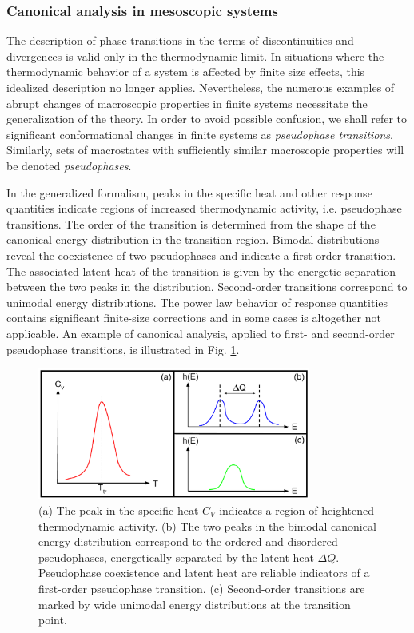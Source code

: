 \documentclass[12pt]{report}
\begin{document}
\subsubsection{Canonical analysis in mesoscopic systems} 
The description of phase transitions in the terms of discontinuities and divergences is valid only in the thermodynamic limit. In situations where the thermodynamic behavior of a system is affected by finite size effects, this idealized description no longer applies. Nevertheless, the numerous examples of abrupt changes of macroscopic properties in finite systems necessitate the generalization of the theory. In order to avoid possible confusion, we shall refer to significant conformational changes in finite systems as \textit{pseudophase transitions}. Similarly, sets of macrostates with sufficiently similar macroscopic properties will be denoted \textit{pseudophases}.

In the generalized formalism, peaks in the specific heat and other response quantities indicate regions of increased thermodynamic activity, i.e. pseudophase transitions. The order of the transition is determined from the shape of the canonical energy distribution in the transition region. Bimodal distributions reveal the coexistence of two pseudophases and indicate a first-order transition\cite{Janke1998}. The associated latent heat of the transition is given by the energetic separation between the two peaks in the distribution. Second-order transitions correspond to unimodal energy distributions. The power law behavior of response quantities contains significant finite-size corrections and in some cases is altogether not applicable\cite{Landau2000}. An example of canonical analysis, applied to first- and second-order pseudophase transitions, is illustrated in Fig. \ref{fig:Fig_5}. 

\begin{figure}
\center
\includegraphics[width = 0.8\textwidth]{chapter2Figs/CanonicalAnalysisSample.pdf}
\caption{\label{fig:Fig_5}%
(a) The peak in the specific heat $C_{V}$ indicates a region of heightened thermodynamic activity. (b) The two peaks in the bimodal canonical energy distribution correspond to the ordered and disordered pseudophases, energetically separated by the latent heat $\Delta Q$. Pseudophase coexistence and latent heat are reliable indicators of a first-order pseudophase transition. (c) Second-order transitions are marked by wide unimodal energy distributions at the transition point.}
\end{figure}
\end{document}
